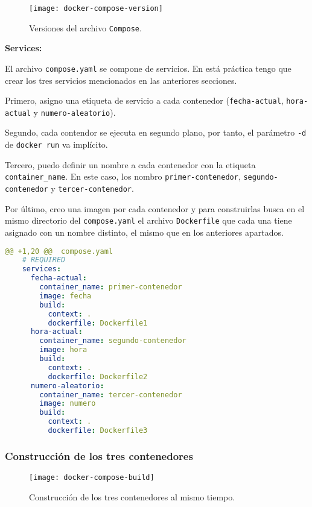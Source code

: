  \begin{figure}[H]
	\texttt{[image: docker-compose-version]}
	\centering
	\caption{Versiones del archivo \texttt{Compose}.}
    \label{fig:docker-compose-version}
\end{figure}

\par \textbf{Services:}
\par El archivo \texttt{compose.yaml} se compone de servicios.
En está práctica tengo que crear los tres servicios mencionados en las anteriores secciones.
\par Primero, asigno una etiqueta de servicio a cada contenedor
(\texttt{fecha-actual}, \texttt{hora-actual} y \texttt{numero-aleatorio}).
\par Segundo, cada contendor se ejecuta en segundo plano, por tanto, el 
parámetro \texttt{-d} de \texttt{docker run} va implícito.
\par Tercero, puedo definir un nombre a cada contenedor con la etiqueta \texttt{container\_name}.
En este caso, los nombro \texttt{primer-contenedor}, \texttt{segundo-contenedor} y \texttt{tercer-contenedor}.
\par Por último, creo una imagen por cada contenedor y para construirlas busca en el mismo directorio del \texttt{compose.yaml}
el archivo \texttt{Dockerfile} que cada una tiene asignado con un nombre distinto, el mismo que en los anteriores apartados.
\begin{lstlisting}[language=yaml, firstnumber=0]
    @@ +1,20 @@  compose.yaml
    # REQUIRED
    services:
      fecha-actual:
        container_name: primer-contenedor
        image: fecha
        build:
          context: .
          dockerfile: Dockerfile1
      hora-actual:
        container_name: segundo-contenedor
        image: hora
        build:
          context: .
          dockerfile: Dockerfile2
      numero-aleatorio:
        container_name: tercer-contenedor
        image: numero
        build: 
          context: .
          dockerfile: Dockerfile3
\end{lstlisting}

\subsubsection{Construcción de los tres contenedores}
\begin{figure}[H]
    \texttt{[image: docker-compose-build]}
    \centering
    \caption{Construcción de los tres contenedores al mismo tiempo.}
    \label{fig:docker-compose-build}
 \end{figure}

